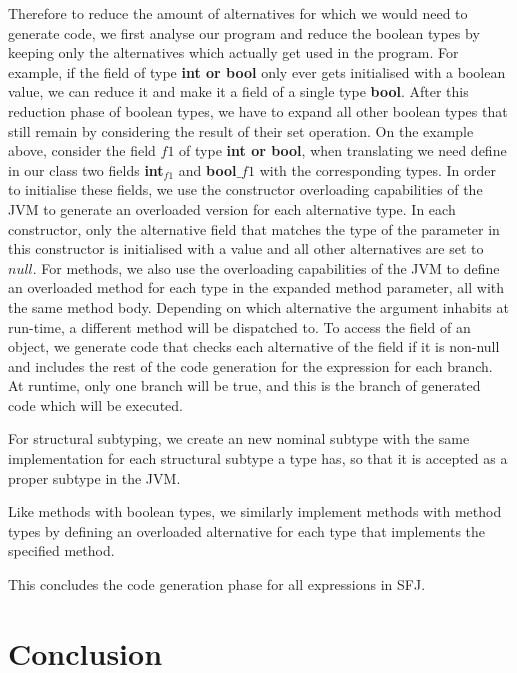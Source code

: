 \documentclass[runningheads]{llncs}
\begin{document}
Therefore to reduce the amount of alternatives for which we would need to generate code, we first analyse our program and reduce the boolean types by keeping only the alternatives which actually get used in the program.
For example, if the field of type \textbf{int or bool} only ever gets initialised with a boolean value, we can reduce it and make it a field of a single type \textbf{bool}.
%
After this reduction phase of boolean types, we have to expand all other boolean types that still remain by considering the result of their set operation.
On the example above, consider the field  $f1$ of type \textbf{int or bool}, when translating we need define in our class two fields \textbf{int}$_{f1}$ and \textbf{bool}$\_{f1}$ with the corresponding types.
In order to initialise these fields, we use the constructor overloading capabilities of the JVM to generate an overloaded version for each alternative type.
In each constructor, only the alternative field that matches the type of the parameter in this constructor is initialised with a value and all other alternatives are set to $null$.
%
For methods, we also use the overloading capabilities of the JVM to define an  overloaded method for each type in the expanded method parameter, all with the same method body.
Depending on which alternative the argument inhabits at run-time, a different method will be dispatched to.
%
To access the field of an object, we generate code that checks each alternative of the field if it is non-null and includes the rest of the code generation for the expression for each branch. At runtime, only one branch will be true, and this is the branch of generated code which will be executed.

For structural subtyping, we create an new nominal subtype with the same implementation for each structural subtype a type has, so that it is accepted as a proper subtype in the JVM.

Like methods with boolean types, we similarly implement methods with method types by defining an overloaded alternative for each type that implements the specified method.

This concludes the code generation phase for all expressions in SFJ.

\section{Conclusion}
\label{sec:conclusion}
\end{document}

